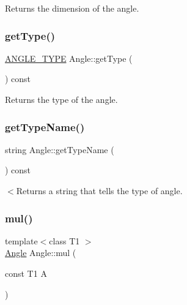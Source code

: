 Returns the dimension of the angle. 

\mbox{\label{class_angle_a827079369e1344c8761723be0665bb2e}} 
\subsubsection{\texorpdfstring{getType()}{getType()}}
{\footnotesize\ttfamily \mbox{\hyperlink{class_angle_a4f7b9849ce8780bcba95ca3ee45cff77}{A\+N\+G\+L\+E\+\_\+\+T\+Y\+PE}} Angle\+::get\+Type (\begin{DoxyParamCaption}{ }\end{DoxyParamCaption}) const\hspace{0.3cm}{\ttfamily [inline]}}



Returns the type of the angle. 

\mbox{\label{class_angle_a3253eb4e061fa49be862120370fb836b}} 
\subsubsection{\texorpdfstring{getTypeName()}{getTypeName()}}
{\footnotesize\ttfamily string Angle\+::get\+Type\+Name (\begin{DoxyParamCaption}{ }\end{DoxyParamCaption}) const\hspace{0.3cm}{\ttfamily [inline]}}

$<$Returns a string that tells the type of angle. \mbox{\label{class_angle_aa1c4b848f4ac7ece9d2fa010abc91511}} 
\subsubsection{\texorpdfstring{mul()}{mul()}}
{\footnotesize\ttfamily template$<$class T1 $>$ \\
\mbox{\hyperlink{class_angle}{Angle}} Angle\+::mul (\begin{DoxyParamCaption}\item[{const T1}]{A }\end{DoxyParamCaption})\hspace{0.3cm}{\ttfamily [inline]}}



